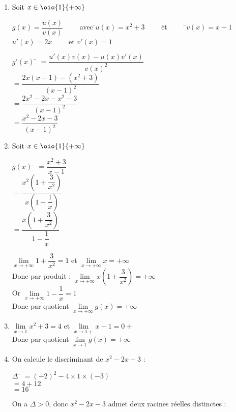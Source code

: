 \documentclass[a4paper,11pt,exos]{nsi} %
\begin{document}
\textcolor{UGLiBlue}{
    \begin{enumerate}
        \item Soit $x\in\oio{1}{+\infty}$
        \begin{tabbing}
            $g(x)=\dfrac{u(x)}{v(x)}\qquad$ avec  \=$u(x)=x^2+3\qquad$ \=et $\qquad$ \=$v(x)=x-1$\\
            \>$u'(x)=2x\qquad$ \>et \>$v'(x)=1$
        \end{tabbing}
        \begin{tabbing}
            $g'(x)$ \= $=\dfrac{u'(x)v(x)-u(x)v'(x)}{v(x)^2}$\\[.5em]
            \> $=\dfrac{2x(x-1)-(x^2+3)}{(x-1)^2}$\\[.5em]
            \> $=\dfrac{2x^2-2x-x^2-3}{(x-1)^2}$\\[.5em]
            \> $=\dfrac{x^2-2x-3}{(x-1)^2}$
        \end{tabbing}
        \item Soit $x\in\oio{1}{+\infty}$
        \begin{tabbing}
            $g(x)$ \= $=\dfrac{x^2+3}{x-1}$\\
            \> $=\dfrac{x^2\left(1+\dfrac{3}{x^2}\right)}{x\left(1-\dfrac{1}{x}\right)}$\\[.5em]
            \> $=\dfrac{x\left(1+\dfrac{3}{x^2}\right)}{1-\dfrac{1}{x}}$
        \end{tabbing}
        $\lim\limits_{x\to +\infty}1+\dfrac{3}{x^2}=1$ et $\lim\limits_{x\to +\infty} x=+\infty$\\
        Donc par produit : $\lim\limits_{x\to +\infty}x\left(1+\dfrac{3}{x^2}\right)=+\infty$\\[1em]
        Or $\lim\limits_{x\to +\infty}1-\dfrac{1}{x}=1$\\
        Donc par quotient $\lim\limits_{x\to +\infty}g(x)=+\infty$
        \item $\lim\limits_{x\to 1}x^2+3=4$ et $\lim\limits_{x\to 1+}x-1=0+$\\
        Donc par quotient $\lim\limits_{x\to 1}g(x)=+\infty$
        \item On calcule le discriminant de $x^2-2x-3$ : 
        \begin{tabbing}
            $\Delta$ \= $=(-2)^2-4\times 1\times (-3)$\\
            \> $=4+12$\\
            \> $=16$
        \end{tabbing}
        On a $\Delta>0$, donc $x^2-2x-3$ admet deux racines réelles distinctes : 

\end{enumerate}}
\end{document}
